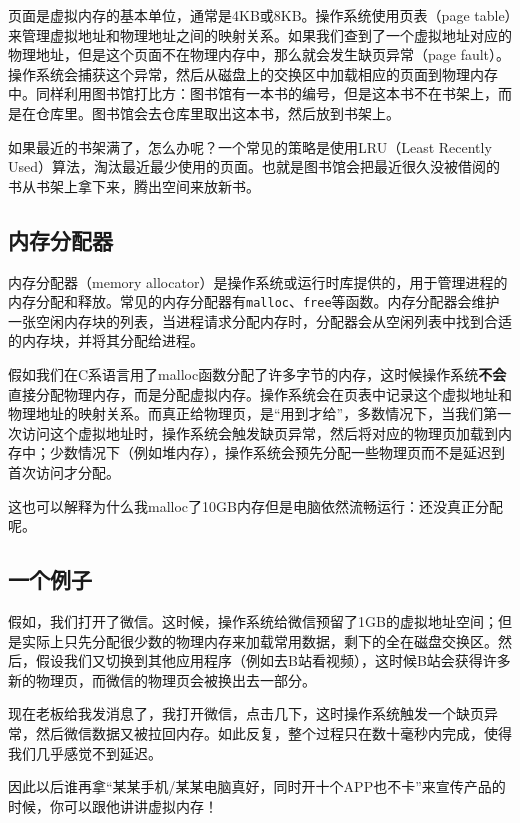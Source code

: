 \documentclass[../main.tex]{subfiles}
\begin{document}
页面是虚拟内存的基本单位，通常是4KB或8KB。操作系统使用页表（page table）来管理虚拟地址和物理地址之间的映射关系。如果我们查到了一个虚拟地址对应的物理地址，但是这个页面不在物理内存中，那么就会发生缺页异常（page fault）。操作系统会捕获这个异常，然后从磁盘上的交换区中加载相应的页面到物理内存中。同样利用图书馆打比方：图书馆有一本书的编号，但是这本书不在书架上，而是在仓库里。图书馆会去仓库里取出这本书，然后放到书架上。

如果最近的书架满了，怎么办呢？一个常见的策略是使用LRU（Least Recently Used）算法，淘汰最近最少使用的页面。也就是图书馆会把最近很久没被借阅的书从书架上拿下来，腾出空间来放新书。

\subsection{内存分配器}

内存分配器（memory allocator）是操作系统或运行时库提供的，用于管理进程的内存分配和释放。常见的内存分配器有\texttt{malloc}、\texttt{free}等函数。内存分配器会维护一张空闲内存块的列表，当进程请求分配内存时，分配器会从空闲列表中找到合适的内存块，并将其分配给进程。

假如我们在C系语言用了malloc函数分配了许多字节的内存，这时候操作系统\textbf{不会}直接分配物理内存，而是分配虚拟内存。操作系统会在页表中记录这个虚拟地址和物理地址的映射关系。而真正给物理页，是“用到才给”，多数情况下，当我们第一次访问这个虚拟地址时，操作系统会触发缺页异常，然后将对应的物理页加载到内存中；少数情况下（例如堆内存），操作系统会预先分配一些物理页而不是延迟到首次访问才分配。

这也可以解释为什么我malloc了10GB内存但是电脑依然流畅运行：还没真正分配呢。

\subsection{一个例子}

假如，我们打开了微信。这时候，操作系统给微信预留了1GB的虚拟地址空间；但是实际上只先分配很少数的物理内存来加载常用数据，剩下的全在磁盘交换区。然后，假设我们又切换到其他应用程序（例如去B站看视频），这时候B站会获得许多新的物理页，而微信的物理页会被换出去一部分。

现在老板给我发消息了，我打开微信，点击几下，这时操作系统触发一个缺页异常，然后微信数据又被拉回内存。如此反复，整个过程只在数十毫秒内完成，使得我们几乎感觉不到延迟。

{ \kaishu 因此以后谁再拿“某某手机/某某电脑真好，同时开十个APP也不卡”来宣传产品的时候，你可以跟他讲讲虚拟内存！}
\end{document}
